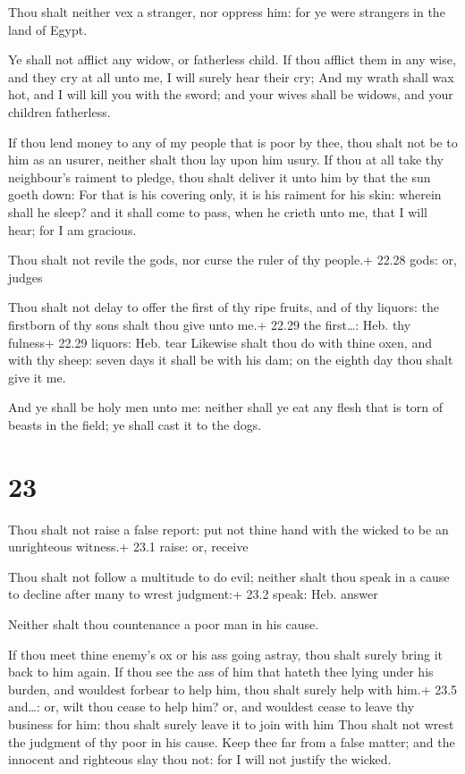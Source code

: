  Thou shalt neither vex a stranger, nor oppress him: for
ye were strangers in the land of Egypt.

 Ye shall not afflict any widow, or fatherless child.
 If thou afflict them in any wise, and they cry at all unto
me, I will surely hear their cry;  And my wrath shall wax
hot, and I will kill you with the sword; and your wives shall be widows,
and your children fatherless.

 If thou lend money to any of my people that is poor by
thee, thou shalt not be to him as an usurer, neither shalt thou lay upon
him usury.  If thou at all take thy neighbour's raiment to
pledge, thou shalt deliver it unto him by that the sun goeth down:
 For that is his covering only, it is his raiment for his
skin: wherein shall he sleep? and it shall come to pass, when he crieth
unto me, that I will hear; for I am gracious.

 Thou shalt not revile the gods, nor curse the ruler of
thy people.+ 22.28 gods: or, judges

 Thou shalt not delay to offer the first of thy ripe
fruits, and of thy liquors: the firstborn of thy sons shalt thou give
unto me.+ 22.29 the first\ldots: Heb. thy fulness+ 22.29 liquors: Heb.
tear  Likewise shalt thou do with thine oxen, and with thy
sheep: seven days it shall be with his dam; on the eighth day thou shalt
give it me.

 And ye shall be holy men unto me: neither shall ye eat
any flesh that is torn of beasts in the field; ye shall cast it to the
dogs.

\hypertarget{section-22}{%
\section{23}\label{section-22}}

 Thou shalt not raise a false report: put not thine hand
with the wicked to be an unrighteous witness.+ 23.1 raise: or, receive

 Thou shalt not follow a multitude to do evil; neither
shalt thou speak in a cause to decline after many to wrest judgment:+
23.2 speak: Heb. answer

 Neither shalt thou countenance a poor man in his cause.

 If thou meet thine enemy's ox or his ass going astray,
thou shalt surely bring it back to him again.  If thou see
the ass of him that hateth thee lying under his burden, and wouldest
forbear to help him, thou shalt surely help with him.+ 23.5 and\ldots:
or, wilt thou cease to help him? or, and wouldest cease to leave thy
business for him: thou shalt surely leave it to join with him
 Thou shalt not wrest the judgment of thy poor in his cause.
 Keep thee far from a false matter; and the innocent and
righteous slay thou not: for I will not justify the wicked.

